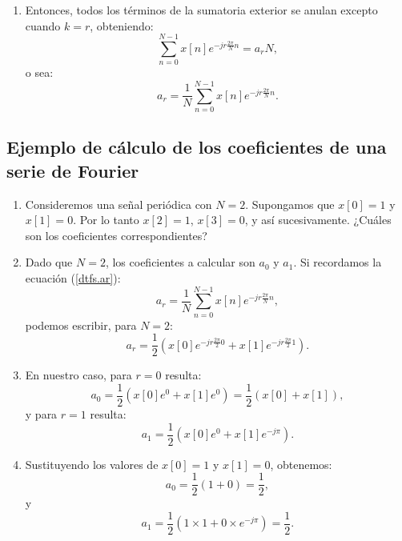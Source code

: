 \begin{enumerate}
	\item Entonces, todos los términos de la sumatoria exterior se anulan excepto cuando $k=r$, obteniendo:
	\begin{equation}
		\sum_{n=0}^{N-1} x[n] e^{-jr\frac{2\pi}{N}n} = a_{r} N,
	\end{equation}
	o sea:
	\begin{equation}
		a_{r} = \frac{1}{N} \sum_{n=0}^{N-1} x[n] e^{-jr\frac{2\pi}{N}n}.
		\label{dtfs.ar}
	\end{equation}
\end{enumerate}

\subsection{Ejemplo de cálculo de los coeficientes de una serie de Fourier}
\begin{enumerate}
	\item Consideremos una señal periódica con $N = 2$. Supongamos que $x[0] = 1$ y $x[1] = 0$.
	Por lo tanto $x[2] = 1$, $x[3] = 0$, y así sucesivamente. ¿Cuáles son los coeficientes correspondientes?
	
	\item Dado que $N = 2$, los coeficientes a calcular son $a_{0}$ y $a_{1}$. Si recordamos la ecuación (\ref{dtfs.ar}):
	\begin{equation}
		a_{r} = \frac{1}{N} \sum_{n=0}^{N-1} x[n] e^{-jr\frac{2\pi}{N}n},
	\end{equation}
	podemos escribir, para $N = 2$:
	\begin{equation}
		a_{r} = \frac{1}{2} \left(x[0] e^{-jr\frac{2\pi}{2}0} + x[1] e^{-jr\frac{2\pi}{2}1}\right).
	\end{equation}
	
	\item En nuestro caso, para $r = 0$ resulta:
	\begin{equation}
		a_{0} = \frac{1}{2} \left(x[0] e^{0} + x[1] e^{0}\right) = \frac{1}{2} (x[0] + x[1]),
	\end{equation}
	y para $r = 1$ resulta:
	\begin{equation}
		a_{1} = \frac{1}{2} \left(x[0] e^{0} + x[1] e^{-j\pi}\right).
	\end{equation}
	
	\item Sustituyendo los valores de $x[0] = 1$ y $x[1] = 0$, obtenemos:
	\begin{equation}
		a_{0} = \frac{1}{2} (1 + 0) = \frac{1}{2},
	\end{equation}
	y
	\begin{equation}
		a_{1} = \frac{1}{2} (1 \times 1 + 0 \times e^{-j\pi}) = \frac{1}{2}.
	\end{equation}
\end{enumerate}

